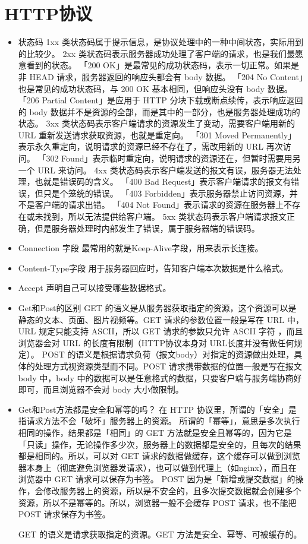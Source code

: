 \documentclass[11pt]{article}
\begin{document}
\section{HTTP协议}
\label{sec:orgece98b7}
\begin{itemize}
\item 状态码
1xx 类状态码属于提示信息，是协议处理中的一种中间状态，实际用到的比较少。
2xx 类状态码表示服务器成功处理了客户端的请求，也是我们最愿意看到的状态。
「200 OK」是最常见的成功状态码，表示一切正常。如果是非 HEAD 请求，服务器返回的响应头都会有 body 数据。
「204 No Content」也是常见的成功状态码，与 200 OK 基本相同，但响应头没有 body 数据。
「206 Partial Content」是应用于 HTTP 分块下载或断点续传，表示响应返回的 body 数据并不是资源的全部，而是其中的一部分，也是服务器处理成功的状态。
3xx 类状态码表示客户端请求的资源发生了变动，需要客户端用新的 URL 重新发送请求获取资源，也就是重定向。
「301 Moved Permanently」表示永久重定向，说明请求的资源已经不存在了，需改用新的 URL 再次访问。
「302 Found」表示临时重定向，说明请求的资源还在，但暂时需要用另一个 URL 来访问。
4xx 类状态码表示客户端发送的报文有误，服务器无法处理，也就是错误码的含义。
「400 Bad Request」表示客户端请求的报文有错误，但只是个笼统的错误。
「403 Forbidden」表示服务器禁止访问资源，并不是客户端的请求出错。
「404 Not Found」表示请求的资源在服务器上不存在或未找到，所以无法提供给客户端。
5xx 类状态码表示客户端请求报文正确，但是服务器处理时内部发生了错误，属于服务器端的错误码。

\item Connection 字段
最常用的就是Keep-Alive字段，用来表示长连接。
\item Content-Type字段
用于服务器回应时，告知客户端本次数据是什么格式。
\item Accept
声明自己可以接受哪些数据格式。
\item Get和Post的区别
GET 的语义是从服务器获取指定的资源，这个资源可以是静态的文本、页面、图片视频等。GET 请求的参数位置一般是写在 URL 中，URL 规定只能支持 ASCII，所以 GET 请求的参数只允许 ASCII 字符 ，而且浏览器会对 URL 的长度有限制（HTTP协议本身对 URL长度并没有做任何规定）。
POST 的语义是根据请求负荷（报文body）对指定的资源做出处理，具体的处理方式视资源类型而不同。POST 请求携带数据的位置一般是写在报文 body 中，body 中的数据可以是任意格式的数据，只要客户端与服务端协商好即可，而且浏览器不会对 body 大小做限制。
\item Get和Post方法都是安全和幂等的吗？
在 HTTP 协议里，所谓的「安全」是指请求方法不会「破坏」服务器上的资源。
所谓的「幂等」，意思是多次执行相同的操作，结果都是「相同」的
GET 方法就是安全且幂等的，因为它是「只读」操作，无论操作多少次，服务器上的数据都是安全的，且每次的结果都是相同的。所以，可以对 GET 请求的数据做缓存，这个缓存可以做到浏览器本身上（彻底避免浏览器发请求），也可以做到代理上（如nginx），而且在浏览器中 GET 请求可以保存为书签。
POST 因为是「新增或提交数据」的操作，会修改服务器上的资源，所以是不安全的，且多次提交数据就会创建多个资源，所以不是幂等的。所以，浏览器一般不会缓存 POST 请求，也不能把 POST 请求保存为书签。

GET 的语义是请求获取指定的资源。GET 方法是安全、幂等、可被缓存的。
\end{itemize}
\end{document}
